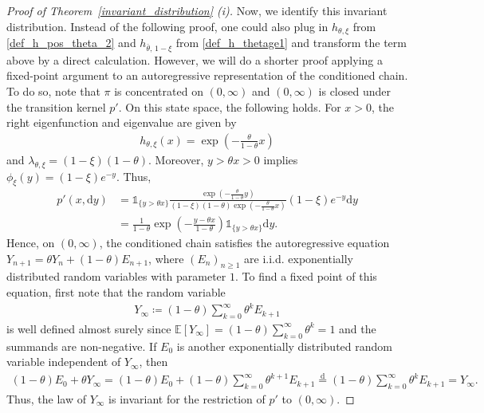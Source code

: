 \documentclass[12pt]{article}
\newcommand{\E}{\mathbb{E}} %
\newcommand{\1}{\mathds{1}}
\renewcommand{\d}{\mathrm{d}}
\theoremstyle{definition}
\theoremstyle{plain}
\theoremstyle{remark}
\begin{document}
\begin{proof}[Proof of Theorem~\ref{invariant_distribution} (i)]
Now, we identify this invariant distribution. Instead of the following proof, one could also plug in $h_{\theta,\xi}$ from \eqref{def_h_pos_theta_2} and $h_{\bar\theta,\,1-\xi}$ from \eqref{def_h_thetage1} and transform the term above by a direct calculation. However, we will do a shorter proof applying a fixed-point argument to an autoregressive representation of the conditioned chain. To do so, note that  $\pi$ is concentrated on $(0,\infty)$ and $(0,\infty)$ is closed under the transition kernel $p'$. On this state space, the following holds. For $x>0$, the right eigenfunction and eigenvalue are given by 
\begin{align*} 
    h_{\theta,\xi}(x) = \exp\left( -\frac{\theta}{1-\theta}x \right) 
\end{align*} 
and $\lambda_{\theta,\xi} = (1-\xi)(1-\theta)$.
Moreover, $y>\theta x>0$ implies $ \phi_\xi(y) = (1-\xi)e^{-y}$.
Thus, 
\begin{align*} 
    p' (x,\d y) 
    &= \mathds{1}_{\{y>\theta x\}} \frac{ \exp\left( -\frac{\theta}{1-\theta}y \right) }{ (1-\xi)(1-\theta) \exp\left( -\frac{\theta}{1-\theta}x \right) } (1-\xi)e^{-y}\d y 
    \\ &= \frac{1}{1-\theta} \exp\left( -\frac{y-\theta x}{1-\theta} \right) \mathds{1}_{\{y>\theta x\}} \d y. 
\end{align*} 
Hence, on $(0,\infty)$, the conditioned chain satisfies the autoregressive equation $Y_{n+1} = \theta Y_n+(1-\theta)E_{n+1}$, 
where $(E_n)_{n\geq1}$ are i.i.d. exponentially distributed random variables with parameter $1$. To find a fixed point of this equation, first note that the random variable 
\begin{align*} 
    Y_\infty \coloneqq (1-\theta) \sum_{k=0}^\infty \theta^kE_{k+1} 
\end{align*} 
is well defined almost surely since $\E[Y_\infty]=(1-\theta)\sum_{k=0}^\infty \theta^k=1$ and the summands are non-negative. If $E_0$ is another exponentially distributed random variable independent of $Y_\infty$, then 
\begin{align*} 
    (1-\theta)E_0+\theta Y_\infty 
    = (1-\theta)E_0 + (1-\theta) \sum_{k=0}^\infty \theta^{k+1}E_{k+1} 
    \overset{\d}{=} (1-\theta) \sum_{k=0}^\infty \theta^kE_{k+1} 
    = Y_\infty. 
\end{align*} 
Thus, the law of $Y_\infty$ is invariant for the restriction of $p'$ to $(0,\infty)$. 


\end{proof}
\end{document}
